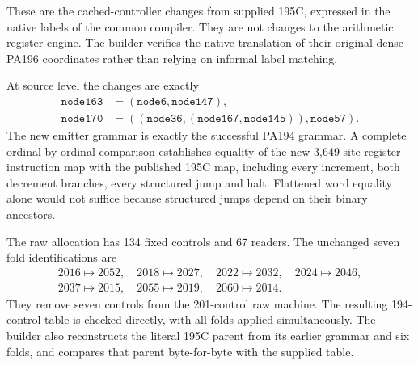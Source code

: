 \documentclass[11pt,letterpaper]{article}
\begin{document}
These are the cached-controller changes from supplied 195C, expressed in the
native labels of the common compiler. They are not changes to the arithmetic
register engine. The builder verifies the native translation of their original
dense PA196 coordinates rather than relying on informal label matching.

At source level the changes are exactly
\[
\begin{aligned}
 \texttt{node163}&=(\texttt{node6},\texttt{node147}),\\
 \texttt{node170}&=((\texttt{node36},(\texttt{node167},\texttt{node145})),
                         \texttt{node57}).
\end{aligned}
\]
The new emitter grammar is exactly the successful PA194 grammar. A complete
ordinal-by-ordinal comparison establishes equality of the new 3,649-site
register instruction map with the published 195C map, including every
increment, both decrement branches, every structured jump and halt.
Flattened word equality alone would not suffice because structured jumps
depend on their binary ancestors.

The raw allocation has 134 fixed controls and 67 readers. The unchanged
seven fold identifications are
\[
\begin{gathered}
2016\mapsto2052,\quad2018\mapsto2027,\quad2022\mapsto2032,\quad
2024\mapsto2046,\\
2037\mapsto2015,\quad2055\mapsto2019,\quad2060\mapsto2014.
\end{gathered}
\]
They remove seven controls from the 201-control raw machine. The resulting
194-control table is checked directly, with all folds applied simultaneously.
The builder also reconstructs the literal 195C parent from its earlier grammar
and six folds, and compares that parent byte-for-byte with the supplied table.
\end{document}
